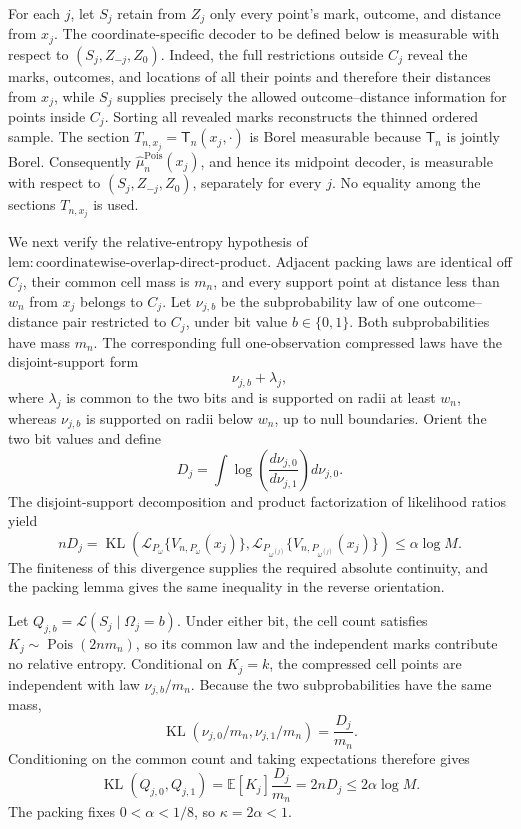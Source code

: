 For each \(j\), let \(S_j\) retain from \(Z_j\) only every point's mark, outcome, and distance from \(x_j\).  The coordinate-specific decoder to be defined below is measurable with respect to \((S_j,Z_{-j},Z_0)\).  Indeed, the full restrictions outside \(C_j\) reveal the marks, outcomes, and locations of all their points and therefore their distances from \(x_j\), while \(S_j\) supplies precisely the allowed outcome--distance information for points inside \(C_j\).  Sorting all revealed marks reconstructs the thinned ordered sample.  The section \(T_{n,x_j}=\mathsf T_n(x_j,\cdot)\) is Borel measurable because \(\mathsf T_n\) is jointly Borel.  Consequently \(\widehat\mu_n^{\mathrm{Pois}}(x_j)\), and hence its midpoint decoder, is measurable with respect to \((S_j,Z_{-j},Z_0)\), separately for every \(j\).  No equality among the sections \(T_{n,x_j}\) is used.

We next verify the relative-entropy hypothesis of \(\mathrm{lem:coordinatewise\text{-}overlap\text{-}direct\text{-}product}\).  Adjacent packing laws are identical off \(C_j\), their common cell mass is \(m_n\), and every support point at distance less than \(w_n\) from \(x_j\) belongs to \(C_j\).  Let \(\nu_{j,b}\) be the subprobability law of one outcome--distance pair restricted to \(C_j\), under bit value \(b\in\{0,1\}\).  Both subprobabilities have mass \(m_n\).  The corresponding full one-observation compressed laws have the disjoint-support form
\[
 \nu_{j,b}+\lambda_j,
\]
where \(\lambda_j\) is common to the two bits and is supported on radii at least \(w_n\), whereas \(\nu_{j,b}\) is supported on radii below \(w_n\), up to null boundaries.  Orient the two bit values and define
\[
 D_j=\int\log\!\left(\frac{d\nu_{j,0}}{d\nu_{j,1}}\right)d\nu_{j,0}.
\]
The disjoint-support decomposition and product factorization of likelihood ratios yield
\[
 nD_j
 =\operatorname{KL}\!\left(
 \mathcal L_{P_\omega}\{V_{n,P_\omega}(x_j)\},
 \mathcal L_{P_{\omega^{(j)}}}\{V_{n,P_{\omega^{(j)}}}(x_j)\}
 \right)
 \leq\alpha\log M.
\]
The finiteness of this divergence supplies the required absolute continuity, and the packing lemma gives the same inequality in the reverse orientation.

Let \(Q_{j,b}=\mathcal L(S_j\mid\Omega_j=b)\).  Under either bit, the cell count satisfies \(K_j\sim\operatorname{Pois}(2nm_n)\), so its common law and the independent marks contribute no relative entropy.  Conditional on \(K_j=k\), the compressed cell points are independent with law \(\nu_{j,b}/m_n\).  Because the two subprobabilities have the same mass,
\[
 \operatorname{KL}(\nu_{j,0}/m_n,\nu_{j,1}/m_n)=\frac{D_j}{m_n}.
\]
Conditioning on the common count and taking expectations therefore gives
\[
 \operatorname{KL}(Q_{j,0},Q_{j,1})
 =\mathbb E[K_j]\frac{D_j}{m_n}
 =2nD_j
 \leq2\alpha\log M.
\]
The packing fixes \(0<\alpha<1/8\), so \(\kappa=2\alpha<1\).

